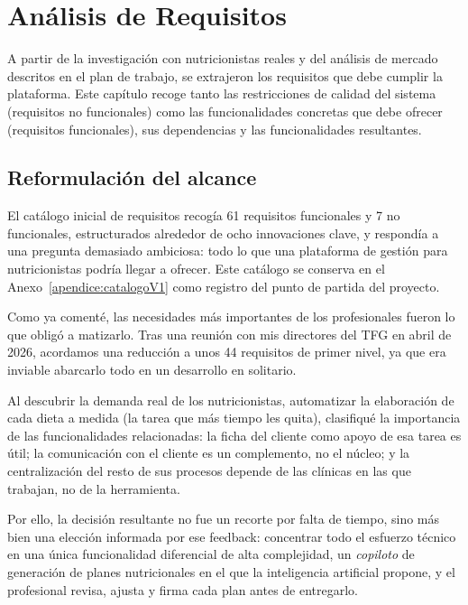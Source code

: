 \chapter{Análisis de Requisitos}
\label{cap:analisisRequisitos}

A partir de la investigación con nutricionistas reales y del análisis de mercado descritos en el plan de trabajo, se extrajeron los requisitos que debe cumplir la plataforma. Este capítulo recoge tanto las restricciones de calidad del sistema (requisitos no funcionales) como las funcionalidades concretas que debe ofrecer (requisitos funcionales), sus dependencias y las funcionalidades resultantes.

\section{Reformulación del alcance}
\label{sec:reformulacionAlcance}

El catálogo inicial de requisitos recogía 61 requisitos funcionales y 7 no funcionales, estructurados alrededor de ocho innovaciones clave, y respondía a una pregunta demasiado ambiciosa: todo lo que una plataforma de gestión para nutricionistas podría llegar a ofrecer. Este catálogo se conserva en el Anexo~\ref{apendice:catalogoV1} como registro del punto de partida del proyecto.

Como ya comenté, las necesidades más importantes de los profesionales fueron lo que obligó a matizarlo. Tras una reunión con mis directores del TFG en abril de 2026, acordamos una reducción a unos 44 requisitos de primer nivel, ya que era inviable abarcarlo todo en un desarrollo en solitario.

Al descubrir la demanda real de los nutricionistas, automatizar la elaboración de cada dieta a medida (la tarea que más tiempo les quita), clasifiqué la importancia de las funcionalidades relacionadas: la ficha del cliente como apoyo de esa tarea es útil; la comunicación con el cliente es un complemento, no el núcleo; y la centralización del resto de sus procesos depende de las clínicas en las que trabajan, no de la herramienta. 

Por ello, la decisión resultante no fue un recorte por falta de tiempo, sino más bien una elección informada por ese feedback: concentrar todo el esfuerzo técnico en una única funcionalidad diferencial de alta complejidad, un \textit{copiloto} de generación de planes nutricionales en el que la inteligencia artificial propone, y el profesional revisa, ajusta y firma cada plan antes de entregarlo.

